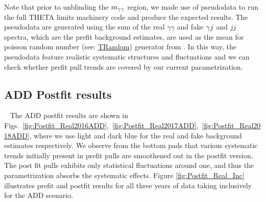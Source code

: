 Note that prior to unblinding the $m_{\gamma\gamma}$ region, we made use of pseudodata to run the full \textrm{THETA} limits machinery code and produce the expected results. The pseudodata are generated using the sum of the real $\gamma\gamma$ and fake $\gamma j$ and $jj$ spectra, which are the prefit background estimates, are used as the mean for poisson random number (see: \href{https://root.cern.ch/doc/master/classTRandom.html#a1529ed28e6ce1230d135548460b12c19}{TRandom}) generator from \ROOT. In this way, the pseudodata feature realistic systematic structures and fluctuations and we can check whether prefit pull trends are covered by our current parametrization. 


\subsection{ADD Postfit results}~\label{sec:ADDPostfits}
 The ADD postfit results are shown in Figs.~\ref{fig:Postfit_Real2016ADD},~\ref{fig:Postfit_Real2017ADD},~\ref{fig:Postfit_Real2018ADD}, where we use light and dark blue for the real and fake background estimates respectively.
We observe from the bottom pads that various systematic trends initially present in prefit pulls are smoothened out in the postfit version. The post fit pulls exhibits only statistical fluctuations around one, and thus the \mgg parametrization absorbs the systematic effects. Figure \ref{fig:Postfit_Real_Inc} illustrates prefit and postfit results for all three years of data taking inclusively for the ADD scenario.

